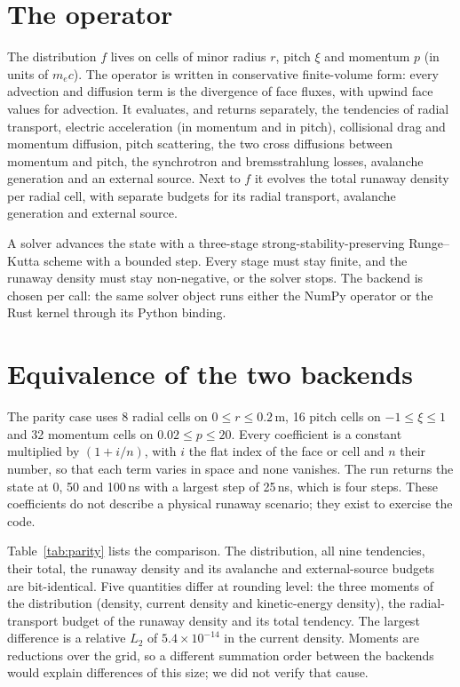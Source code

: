 \documentclass[11pt]{article}
\begin{document}
\section{The operator}

The distribution $f$ lives on cells of minor radius $r$, pitch $\xi$ and
momentum $p$ (in units of $m_e c$).  The operator is written in conservative
finite-volume form: every advection and diffusion term is the divergence of
face fluxes, with upwind face values for advection.  It evaluates, and returns separately, the tendencies of radial
transport, electric acceleration (in momentum and in pitch), collisional drag
and momentum diffusion, pitch scattering, the two cross diffusions between
momentum and pitch, the synchrotron and bremsstrahlung losses, avalanche
generation and an external source.  Next to $f$ it evolves the total runaway
density per radial cell, with separate budgets for its radial transport,
avalanche generation and external source.

A solver advances the state with a three-stage strong-stability-preserving
Runge--Kutta scheme with a bounded step.  Every stage must stay finite, and
the runaway density must stay non-negative, or the solver stops.  The backend is chosen per call: the
same solver object runs either the NumPy operator or the Rust kernel through
its Python binding.

\section{Equivalence of the two backends}

The parity case uses 8 radial cells on $0 \le r \le 0.2$\,m, 16 pitch cells on
$-1 \le \xi \le 1$ and 32 momentum cells on $0.02 \le p \le 20$.  Every
coefficient is a constant multiplied by $(1 + i/n)$, with $i$ the flat index of
the face or cell and $n$ their number, so that each term varies in space and
none vanishes.  The run returns the state at 0, 50 and 100\,ns with a largest
step of 25\,ns, which is four steps.  These coefficients do not describe a
physical runaway scenario; they exist to exercise the code.

Table~\ref{tab:parity} lists the comparison.  The distribution, all nine
tendencies, their total, the runaway density and its avalanche and
external-source budgets are bit-identical.  Five quantities differ at rounding
level: the three moments of the distribution (density, current density and
kinetic-energy density), the radial-transport budget of the runaway density
and its total tendency.  The largest difference is a relative $L_2$ of $5.4
\times 10^{-14}$ in the current density.  Moments are reductions over the
grid, so a different summation order between the backends would explain
differences of this size; we did not verify that cause.
\end{document}
